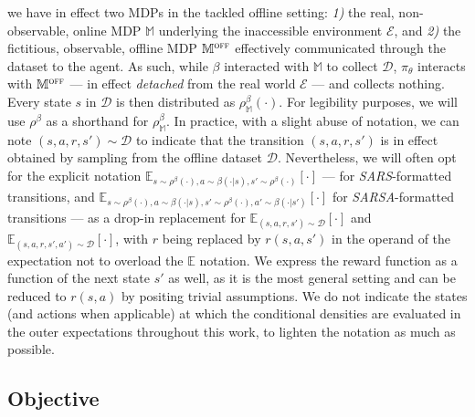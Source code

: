 we have in effect two MDPs in the tackled offline setting:
\textit{1)} the real, non-observable, online MDP $\mathbb{M}$ underlying the
inaccessible environment $\mathcal{E}$, and
\textit{2)} the fictitious, observable, offline MDP $\mathbb{M}^\textsc{off}$
effectively communicated through the dataset to the agent.
As such, while $\beta$ interacted with $\mathbb{M}$ to collect $\mathcal{D}$,
$\pi_\theta$ interacts with $\mathbb{M}^\textsc{off}$
--- in effect \emph{detached} from the real world $\mathcal{E}$
--- and collects nothing.
Every state $s$ in $\mathcal{D}$ is then distributed as $\rho^\beta_\mathbb{M}(\cdot)$.
For legibility purposes, we will use $\rho^\beta$
as a shorthand for $\rho^\beta_\mathbb{M}$.
In practice, with a slight abuse of notation,
we can note $(s,a,r,s') \sim \mathcal{D}$ to indicate that the transition $(s,a,r,s')$
is in effect obtained by sampling from the offline dataset $\mathcal{D}$.
Nevertheless, we will often opt for the explicit notation
$\mathbb{E}_{s \sim \rho^\beta(\cdot), a \sim \beta(\cdot | s),
s' \sim \rho^\beta(\cdot)}[\cdot]$ --- for \textit{SARS}-formatted transitions,
and $\mathbb{E}_{s \sim \rho^\beta(\cdot), a \sim \beta(\cdot | s),
s' \sim \rho^\beta(\cdot), a' \sim \beta(\cdot | s')}[\cdot]$ for \textit{SARSA}-formatted transitions ---
as a drop-in replacement for
$\mathbb{E}_{(s,a,r,s') \sim \mathcal{D}}[\cdot]$
and $\mathbb{E}_{(s,a,r,s',a') \sim \mathcal{D}}[\cdot]$,
with $r$ being replaced by $r(s,a,s')$ in the operand of the expectation
not to overload the $\mathbb{E}$ notation.
We express the reward function as a function of the next state $s'$ as well,
as it is the most general setting and can be reduced to $r(s,a)$ by positing
trivial assumptions.
We do not indicate the states (and actions when applicable)
at which the conditional densities are evaluated in the outer expectations throughout this work,
to lighten the notation as much as possible.

\subsection*{Objective}

